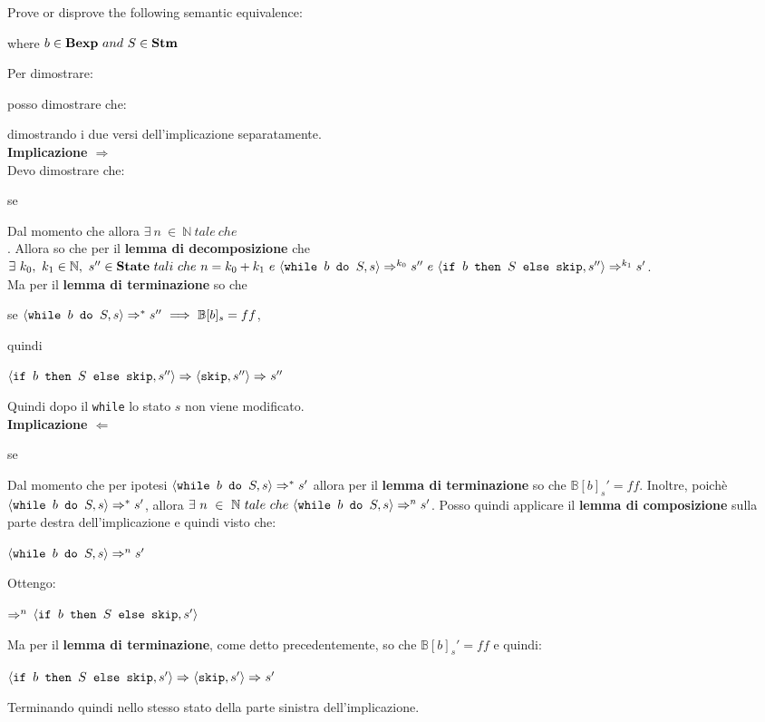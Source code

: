 {
	Prove or disprove the following semantic equivalence:
	\begin{center}
	\exFive{}
	\end{center}
	where $b\in\bexp~and~S\in\stm$
}
{
	Per dimostrare:
	\begin{center}
	\exFive{}
	\end{center}
	posso dimostrare che:
	\begin{center}
	\exFiveIff{}
	\end{center}
	dimostrando i due versi dell'implicazione separatamente.\\

	\textbf{Implicazione $\Longrightarrow{}$}\\
	Devo dimostrare che:
	\begin{center}
	se \exFiveLtR{}
	\end{center}
	Dal momento che \exFiveR{*} allora $\exists~n~\in~\mathbb{N}~tale~che$\\
	. Allora so che per il \textbf{lemma di decomposizione} che 
	$\exists{}~k_0,~k_1\in\mathbb{N},~s''\in\states~tali~che~n=k_0+k_1~e~
	\confSs{\wbS{b}{S}}{s}\Rar{k_0}s''~e~
	\confSs{\ifABC{b}{S}{\skipistr}}{s''}\Rar{k_1}s'$. \\
	Ma per il \textbf{lemma di terminazione} so che 
	\begin{center}
	se $\confSs{\wbS{b}{S}}{s}\Rar{*}s''~\Longrightarrow{}~\mathbb{B}[b]_s=ff$,
	\end{center}
	quindi 
	\begin{center}
	$\confSs{\ifABC{b}{S}{\skipistr}}{s''}\Rar{}
	\confSs{\skipistr}{s''}\Rar{}s''$
	\end{center}
	Quindi dopo il \texttt{while} lo stato $s$ non viene modificato.\\

	\textbf{Implicazione $\Longleftarrow{}$}\\
	\begin{center}
	se \exFiveRtL{}
	\end{center}
	Dal momento che per ipotesi $\confSs{\wbS{b}{S}}{s}\Rar{*}{s'}$ allora
	per il \textbf{lemma di terminazione} so che $\mathbb{B}[b]_s'=ff$.
	Inoltre, poichè $\confSs{\wbS{b}{S}}{s}\Rar{*}{s'}$, allora 
	$\exists~n~\in~\mathbb{N}~tale~che~\confSs{\wbS{b}{S}}{s}\Rar{n}{s'}$.
	Posso quindi applicare il \textbf{lemma di composizione} sulla parte destra
	dell'implicazione e quindi visto che:
	\begin{center}
	$\confSs{\wbS{b}{S}}{s}\Rar{n}{s'}$
	\end{center}
	Ottengo:
	\begin{center}
	$\Rar{n}$
	$\confSs{\ifABC{b}{S}{\skipistr}}{s'}$
	\end{center}
	Ma per il \textbf{lemma di terminazione}, come detto precedentemente, so che
	$\mathbb{B}[b]_s'=ff$ e quindi:
	\begin{center}
	$\confSs{\ifABC{b}{S}{\skipistr}}{s'}\Rar{}\confSs{\skipistr}{s'}\Rar{}s'$
	\end{center}
	Terminando quindi nello stesso stato della parte sinistra dell'implicazione.
}
